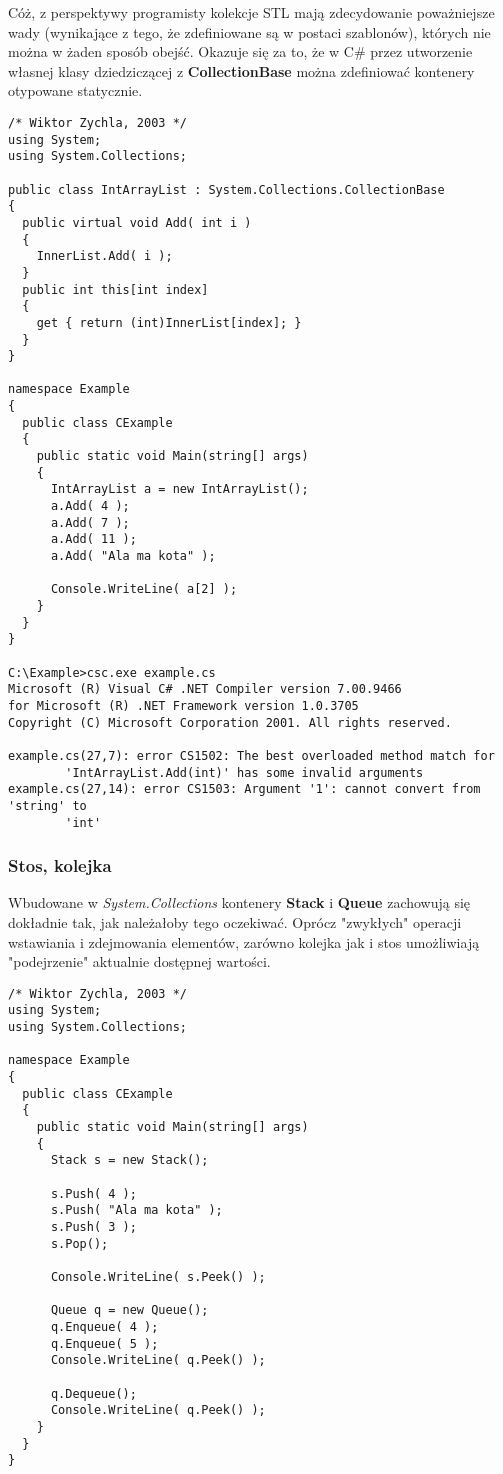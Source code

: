 Cóż, z perspektywy programisty kolekcje STL mają zdecydowanie poważniejsze wady (wynikające z tego, że 
zdefiniowane są w postaci szablonów), których nie można w żaden sposób obejść. Okazuje się za to, że
w C\# przez utworzenie własnej klasy dziedziczącej z {\bf CollectionBase} można
zdefiniować kontenery otypowane statycznie. 

\begin{scriptsize}
\begin{verbatim}
/* Wiktor Zychla, 2003 */
using System;
using System.Collections;

public class IntArrayList : System.Collections.CollectionBase
{
  public virtual void Add( int i )
  {
    InnerList.Add( i );
  }
  public int this[int index]
  {
    get { return (int)InnerList[index]; }
  }
}

namespace Example
{
  public class CExample 
  {
    public static void Main(string[] args)
    {
      IntArrayList a = new IntArrayList();
      a.Add( 4 ); 
      a.Add( 7 );
      a.Add( 11 );
      a.Add( "Ala ma kota" );

      Console.WriteLine( a[2] ); 
    }
  }
}

C:\Example>csc.exe example.cs
Microsoft (R) Visual C# .NET Compiler version 7.00.9466
for Microsoft (R) .NET Framework version 1.0.3705
Copyright (C) Microsoft Corporation 2001. All rights reserved.

example.cs(27,7): error CS1502: The best overloaded method match for
        'IntArrayList.Add(int)' has some invalid arguments
example.cs(27,14): error CS1503: Argument '1': cannot convert from 'string' to
        'int'
\end{verbatim}
\end{scriptsize}

\subsubsection{Stos, kolejka}

Wbudowane w {\em System.Collections} kontenery {\bf Stack} i {\bf Queue} zachowują się dokładnie tak,
jak należałoby tego oczekiwać. Oprócz "zwykłych" operacji wstawiania i zdejmowania elementów, 
zarówno kolejka jak i stos umożliwiają "podejrzenie" aktualnie dostępnej wartości.

\begin{scriptsize}
\begin{verbatim}
/* Wiktor Zychla, 2003 */
using System;
using System.Collections;

namespace Example
{
  public class CExample 
  {
    public static void Main(string[] args)
    {
      Stack s = new Stack();

      s.Push( 4 );
      s.Push( "Ala ma kota" );
      s.Push( 3 );
      s.Pop();

      Console.WriteLine( s.Peek() );

      Queue q = new Queue();
      q.Enqueue( 4 );
      q.Enqueue( 5 );
      Console.WriteLine( q.Peek() );

      q.Dequeue();      
      Console.WriteLine( q.Peek() );
    }
  }
}
\end{verbatim}
\end{scriptsize}

